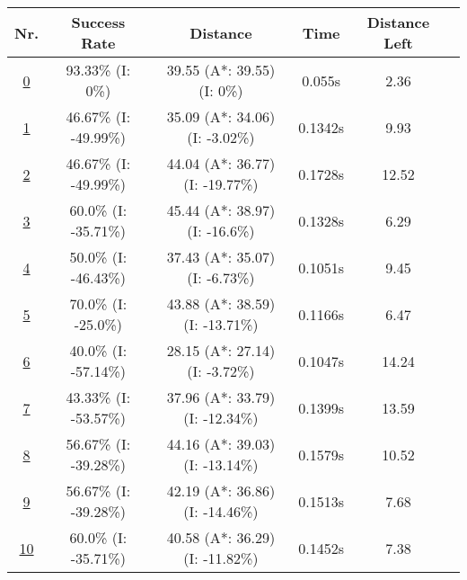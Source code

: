 \pagebreak

\begin{table}[] 
\footnotesize 
\small
\centering

\begin{tabular}{|cc|c|c|c|c|c|}
\hline
\multicolumn{2}{|c|}{\textbf{Nr.}} & \textbf{Success Rate} & \textbf{Distance} & \textbf{Time} & \textbf{Distance Left}\\
\hline
\hline
\multicolumn{2}{|c|}{\cellcolor{lightgray!20} \hyperref[tab: evalalgorithms]{0}} & 93.33\% (I: 0\%) & 39.55 (A*: 39.55) (I: 0\%) & 0.055s & 2.36\\
\hline
\hline
\multicolumn{2}{|c|}{\cellcolor{red!40} \hyperref[tab: evalalgorithms]{1}} & 46.67\% (I: -49.99\%) & 35.09 (A*: 34.06) (I: -3.02\%) & 0.1342s & 9.93\\
\hline
\multicolumn{2}{|c|}{\cellcolor{red!20} \hyperref[tab: evalalgorithms]{2}} & 46.67\% (I: -49.99\%) & 44.04 (A*: 36.77) (I: -19.77\%) & 0.1728s & 12.52\\
\hline
\multicolumn{2}{|c|}{\cellcolor{red!20} \hyperref[tab: evalalgorithms]{3}} & 60.0\% (I: -35.71\%) & 45.44 (A*: 38.97) (I: -16.6\%) & 0.1328s & 6.29\\
\hline
\multicolumn{2}{|c|}{\cellcolor{red!20} \hyperref[tab: evalalgorithms]{4}} & 50.0\% (I: -46.43\%) & 37.43 (A*: 35.07) (I: -6.73\%) & 0.1051s & 9.45\\
\hline
\multicolumn{2}{|c|}{\cellcolor{red!20} \hyperref[tab: evalalgorithms]{5}} & 70.0\% (I: -25.0\%) & 43.88 (A*: 38.59) (I: -13.71\%) & 0.1166s & 6.47\\
\hline
\hline
\multicolumn{2}{|c|}{\cellcolor{blue!20} \hyperref[tab: evalalgorithms]{6}} & 40.0\% (I: -57.14\%) & 28.15 (A*: 27.14) (I: -3.72\%) & 0.1047s & 14.24\\
\hline
\multicolumn{2}{|c|}{\cellcolor{blue!40} \hyperref[tab: evalalgorithms]{7}} & 43.33\% (I: -53.57\%) & 37.96 (A*: 33.79) (I: -12.34\%) & 0.1399s & 13.59\\
\hline
\multicolumn{2}{|c|}{\cellcolor{blue!20} \hyperref[tab: evalalgorithms]{8}} & 56.67\% (I: -39.28\%) & 44.16 (A*: 39.03) (I: -13.14\%) & 0.1579s & 10.52\\
\hline
\multicolumn{2}{|c|}{\cellcolor{blue!20} \hyperref[tab: evalalgorithms]{9}} & 56.67\% (I: -39.28\%) & 42.19 (A*: 36.86) (I: -14.46\%) & 0.1513s & 7.68\\
\hline
\multicolumn{2}{|c|}{\cellcolor{blue!20} \hyperref[tab: evalalgorithms]{10}} & 60.0\% (I: -35.71\%) & 40.58 (A*: 36.29) (I: -11.82\%) & 0.1452s & 7.38\\

\end{tabular}
\end{table}
